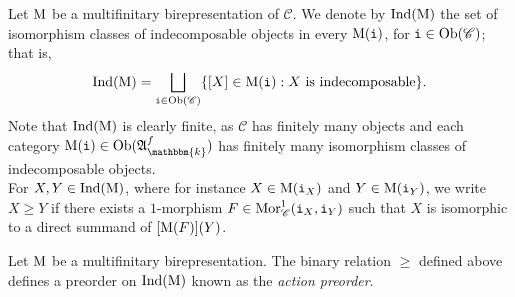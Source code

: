 \noindent Let $\textnormal{M}$ be a multifinitary birepresentation of $\mathscr{C}$. We denote by $\textnormal{Ind}(\textnormal{M})$ the set of isomorphism classes of indecomposable objects in every $\textnormal{M}(\textnormal{\texttt{i}})$, for $\textnormal{\texttt{i}} \in \textnormal{Ob}(\mathscr{C})$; that is,
\begin{align*}
\begin{split}
\textnormal{Ind}(\textnormal{M}) = \bigsqcup_{\textnormal{\texttt{i}} \in \textnormal{Ob}(\mathscr{C})} \{[X] \in \textnormal{M}(\textnormal{\texttt{i}}) : \textnormal{$X$ is indecomposable}\}.
\end{split}
\end{align*}
\noindent Note that $\textnormal{Ind}(\textnormal{M})$ is clearly finite, as $\mathscr{C}$ has finitely many objects and each category $\textnormal{M}(\textobj{i}) \in \obset(\mathfrak{A}_\mathbbm{k}^f)$ has finitely many isomorphism classes of indecomposable objects.\\

\noindent For $X, Y \in \textnormal{Ind}(\textnormal{M})$, where for instance $X \in \textnormal{M}(\textnormal{\texttt{i}}_X)$ and $Y \in \textnormal{M}(\textnormal{\texttt{i}}_Y)$, we write $X \geq Y$ if there exists a $1$-morphism $F \in \textnormal{Mor}_\mathscr{C}^1(\textnormal{\texttt{i}}_X, \textnormal{\texttt{i}}_Y)$ such that $X$ is isomorphic to a direct summand of $[\textnormal{M}(F)](Y)$.\\

\noindent\begin{lemma}\label{ActionPreorder} Let $\textnormal{M}$ be a multifinitary birepresentation. The binary relation $\geq$ defined above defines a preorder on $\textnormal{Ind}(\textnormal{M})$ known as the {\em action preorder}.\\
\end{lemma}


